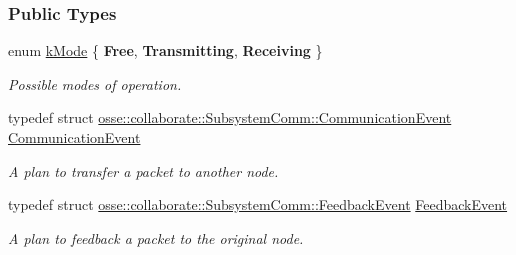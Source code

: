 \subsubsection*{Public Types}
\begin{DoxyCompactItemize}
\item 
\mbox{\label{classosse_1_1collaborate_1_1_subsystem_comm_a5e1ce4f232ca2aae0b99d1225e682190}} 
enum \hyperlink{classosse_1_1collaborate_1_1_subsystem_comm_a5e1ce4f232ca2aae0b99d1225e682190}{k\+Mode} \{ {\bfseries Free}, 
{\bfseries Transmitting}, 
{\bfseries Receiving}
 \}\begin{DoxyCompactList}\small\item\em Possible modes of operation. \end{DoxyCompactList}
\item 
\mbox{\label{classosse_1_1collaborate_1_1_subsystem_comm_abda28dad95a597a9a43053ef2bb62e5c}} 
typedef struct \hyperlink{structosse_1_1collaborate_1_1_subsystem_comm_1_1_communication_event}{osse\+::collaborate\+::\+Subsystem\+Comm\+::\+Communication\+Event} \hyperlink{classosse_1_1collaborate_1_1_subsystem_comm_abda28dad95a597a9a43053ef2bb62e5c}{Communication\+Event}
\begin{DoxyCompactList}\small\item\em A plan to transfer a packet to another node. \end{DoxyCompactList}\item 
\mbox{\label{classosse_1_1collaborate_1_1_subsystem_comm_a679a4916e89a9dfce191486c1b93505d}} 
typedef struct \hyperlink{structosse_1_1collaborate_1_1_subsystem_comm_1_1_feedback_event}{osse\+::collaborate\+::\+Subsystem\+Comm\+::\+Feedback\+Event} \hyperlink{classosse_1_1collaborate_1_1_subsystem_comm_a679a4916e89a9dfce191486c1b93505d}{Feedback\+Event}
\begin{DoxyCompactList}\small\item\em A plan to feedback a packet to the original node. \end{DoxyCompactList}\end{DoxyCompactItemize}
